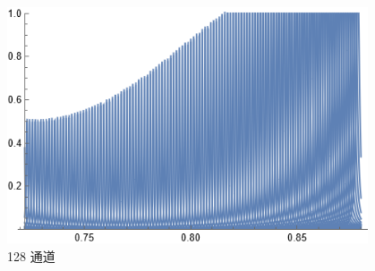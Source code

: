 \begin{frame}[c]
\begin{columns}
\begin{column}{.5\textwidth}
        \end{column}
        \begin{column}{.5\textwidth}
            \begin{figure}[H] %
                \centering %
                \includegraphics[width=1.\textwidth]{figures/128 channels of integrated filter array rapidly fabricated by using the combinatorial deposition technique_3.png} %
                \caption{128 通道} %
            \end{figure}
        \end{column}
    \end{columns}
\end{frame}

